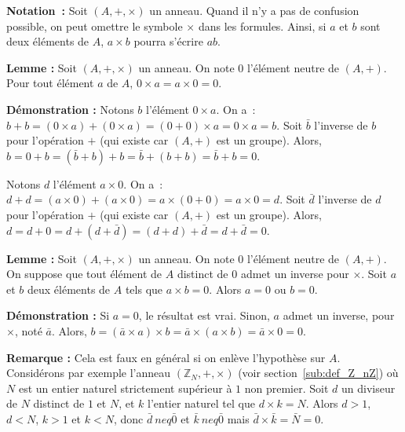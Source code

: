\medskip

\noindent\textbf{Notation :} Soit $(A, +, \times)$ un anneau. 
    Quand il n'y a pas de confusion possible, on peut omettre le symbole $\times$ dans les formules.
    Ainsi, si $a$ et $b$ sont deux éléments de $A$, $a \times b$ pourra s'écrire $a b$.

\medskip

\noindent\textbf{Lemme :} Soit $(A, +, \times)$ un anneau. 
On note $0$ l'élément neutre de $(A, +)$.
Pour tout élément $a$ de $A$, $0 \times a = a \times 0 = 0$.

\medskip

\noindent\textbf{Démonstration :} 
    Notons $b$ l'élément $0 \times a$. 
    On a : $b + b = (0 \times a) + (0 \times a) = (0 + 0) \times a = 0 \times a = b$.
    Soit $\bar{b}$ l'inverse de $b$ pour l'opération $+$ (qui existe car $(A, +)$ est un groupe).
    Alors, $b = 0 + b = (\bar{b} + b) + b = \bar{b} + (b + b) = \bar{b} + b = 0$. 

    Notons $d$ l'élément $a \times 0$. 
    On a : $d + d = (a \times 0) + (a \times 0) = a \times (0 + 0) = a \times 0 = d$.
    Soit $\bar{d}$ l'inverse de $d$ pour l'opération $+$ (qui existe car $(A, +)$ est un groupe).
    Alors, $d = d + 0 = d + (d + \bar{d}) = (d + d) + \bar{d} = d + \bar{d} = 0$. 

    \done

\medskip

\noindent\textbf{Lemme :} Soit $(A, +, \times)$ un anneau. 
On note $0$ l'élément neutre de $(A, +)$.
On suppose que tout élément de $A$ distinct de $0$ admet un inverse pour $\times$.
Soit $a$ et $b$ deux éléments de $A$ tels que $a \times b = 0$.
Alors $a = 0$ ou $b = 0$.

\medskip

\noindent\textbf{Démonstration :} Si $a = 0$, le résultat est vrai.
Sinon, $a$ admet un inverse, pour $\times$, noté $\bar{a}$.
Alors, $b = (\bar{a} \times a) \times b = \bar{a} \times (a \times b) = \bar{a} \times 0 = 0$.

\done

\medskip

\noindent\textbf{Remarque :} Cela est faux en général si on enlève l'hypothèse sur $A$. 
Considérons par exemple l'anneau $(\mathbb{Z}_N, +, \times)$ (voir section~\ref{sub:def_Z_nZ}) où $N$ est un entier naturel strictement supérieur à $1$ non premier. 
Soit $d$ un diviseur de $N$ distinct de $1$ et $N$, et $k$ l'entier naturel tel que $d \times k = N$. 
Alors $d > 1$, $d < N$, $k > 1$ et $k < N$, donc $\bar{d} \ neq \bar{0}$ et $\bar{k} \ neq \bar{0}$ mais $\bar{d} \times \bar{k} = \bar{N} = 0$.

